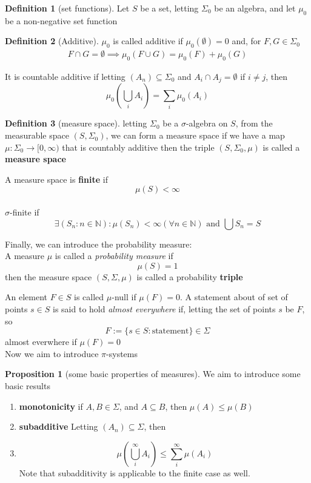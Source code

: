 \documentclass[12pt]{article}
\theoremstyle{definition}
\newtheorem{definition}{Definition}[section]
\newtheorem{proposition}{Proposition}[theorem]
\begin{document}
	\begin{definition}[set functions]
		Let $S$ be a set, letting $\Sigma_0$ be an algebra, and let $\mu_0$ be a non-negative set function 
		
	\end{definition}
	\begin{definition}[Additive]
		$\mu_0$ is called additive if $\mu_0 (\emptyset) = 0$ and, for $F,G \in \Sigma_0$
		\begin{align*}
			F\cap G = \emptyset \implies \mu_0(F \cup G) = \mu_0(F) + \mu_0(G)
		\end{align*}
	\end{definition}
It is countable additive if letting $(A_n) \subseteq \Sigma_0$ and $A_i \cap A_j = \emptyset$ if $i \neq j$, then 
$$
	\mu_0 \left( \bigcup_i A_i \right) = \sum_i \mu_0(A_i)
$$
\begin{definition}[measure space]
	letting $\Sigma_0$ be a $\sigma$-algebra on $S$, from the measurable space $(S,\Sigma_0)$, we can form a measure space if we have a map $\mu \colon \Sigma_0 \to [0,\infty)$ that is countably additive then the triple $(S, \Sigma_0, \mu)$ is called a \textbf{measure space}
\end{definition}
A measure space is \textbf{finite} if 
$$
	\mu(S) < \infty
$$
\\
$\sigma$-finite if 
$$
\exists (S_n \colon n \in \mathbb{N}) 	\colon \mu(S_n) < \infty (\forall n \in \mathbb{N}) \text{ and } \bigcup S_n = S
$$

Finally, we can introduce the probability measure: \\
A measure $\mu$ is called a \textit{probability measure} if 
$$
	\mu(S) = 1
$$
then the measure space $(S, \Sigma, \mu)$ is called a probability \textbf{triple}

An element $F \in S$ is called $\mu$-null if $\mu(F) = 0$. A statement about of set of points $s \in S$ is said to hold \textit{almost everywhere} if, letting the set of points $s$ be $F$, so
$$
	F:= \{s \in S: \text{statement} \} \in \Sigma 
$$
almost everwhere if $\mu(F) = 0$\\
Now we aim to introduce $\pi$-systems
\begin{proposition}[some basic properties of measures]
	We aim to introduce some basic results
	\begin{enumerate}
		\item \textbf{monotonicity} if $A,B \in \Sigma$, and $A \subseteq B$, then $\mu(A) \leq \mu(B)$
		\item \textbf{subadditive} Letting $(A_n) \subseteq \Sigma$, then  
		\item 
		$$
			\mu \left(\bigcup_i^\infty A_i\right) \leq \sum_i^\infty \mu(A_i)
		$$ Note that subadditivity is applicable to the finite case as well.
		
	\end{enumerate}
	
	
\end{proposition}
\end{document}

